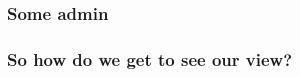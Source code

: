 \documentclass[10pt,t,xcolor=dvipsnames]{beamer}
\begin{document}
\begin{frame}[fragile]
\frametitle{Some admin}

\end{frame}
\begin{frame}[fragile]
\frametitle{So how do we get to see our view?}
\end{frame}
\end{document}
